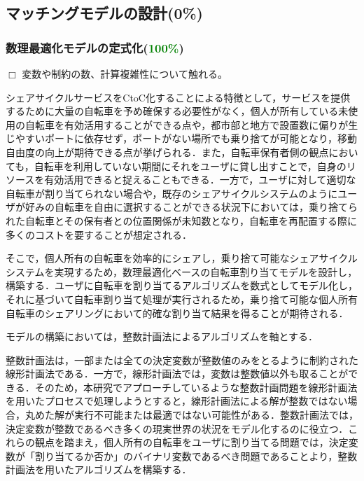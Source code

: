   \subsection{マッチングモデルの設計(0\%)}
    \label{sec:マッチングモデルの設計}
      \par

      \subsubsection{数理最適化モデルの定式化(\textcolor{green}{100\%})}
        \label{sec:数理最適化モデルの定式化}
          \par $\Box$ 変数や制約の数、計算複雑性について触れる。
          \par シェアサイクルサービスをCtoC化することによる特徴として，サービスを提供するために大量の自転車を予め確保する必要性がなく，個人が所有している未使用の自転車を有効活用することができる点や，都市部と地方で設置数に偏りが生じやすいポートに依存せず，ポートがない場所でも乗り捨てが可能となり，移動自由度の向上が期待できる点が挙げられる．また，自転車保有者側の観点においても，自転車を利用していない期間にそれをユーザに貸し出すことで，自身のリソースを有効活用できると捉えることもできる．一方で，ユーザに対して適切な自転車が割り当てられない場合や，既存のシェアサイクルシステムのようにユーザが好みの自転車を自由に選択することができる状況下においては，乗り捨てられた自転車とその保有者との位置関係が未知数となり，自転車を再配置する際に多くのコストを要することが想定される．
          
          \par そこで，個人所有の自転車を効率的にシェアし，乗り捨て可能なシェアサイクルシステムを実現するため，数理最適化ベースの自転車割り当てモデルを設計し，構築する．ユーザに自転車を割り当てるアルゴリズムを数式としてモデル化し，それに基づいて自転車割り当て処理が実行されるため，乗り捨て可能な個人所有自転車のシェアリングにおいて的確な割り当て結果を得ることが期待される．
          
          \par モデルの構築においては，整数計画法によるアルゴリズムを軸とする．
          
          \par 整数計画法は，一部または全ての決定変数が整数値のみをとるように制約された線形計画法である．一方で，線形計画法では，変数は整数値以外も取ることができる．そのため，本研究でアプローチしているような整数計画問題を線形計画法を用いたプロセスで処理しようとすると，線形計画法による解が整数ではない場合，丸めた解が実行不可能または最適ではない可能性がある．整数計画法では，決定変数が整数であるべき多くの現実世界の状況をモデル化するのに役立つ．これらの観点を踏まえ，個人所有の自転車をユーザに割り当てる問題では，決定変数が「割り当てるか否か」のバイナリ変数であるべき問題であることより，整数計画法を用いたアルゴリズムを構築する．
          
